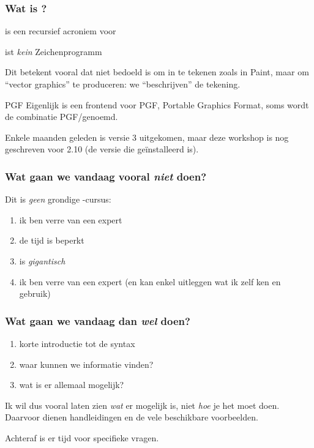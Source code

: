 \begin{frame}
  \frametitle{Wat is \TikZ?}

  \TikZ is een recursief acroniem voor
  \begin{center}
    \TikZ ist \emph{kein} Zeichenprogramm
  \end{center}
  \pause
  Dit betekent vooral dat \TikZ niet bedoeld is om in te tekenen zoals in Paint, maar om ``vector graphics'' te produceren: we ``beschrijven'' de tekening.
  \pause
  \begin{block}{PGF}
    Eigenlijk is \TikZ een frontend voor PGF, Portable Graphics Format, soms wordt de combinatie PGF/\TikZ genoemd.
  \end{block}
  \pause
  Enkele maanden geleden is versie 3 uitgekomen, maar deze workshop is nog geschreven voor 2.10 (de versie die ge\"installeerd is).
\end{frame}

\begin{frame}
  \frametitle{Wat gaan we vandaag vooral \emph{niet} doen?}

  Dit is \emph{geen} grondige \TikZ-cursus:
  \begin{enumerate}
    \item ik ben verre van een expert
    \item de tijd is beperkt
    \item \TikZ is \emph{gigantisch}
    \item\pause ik ben verre van een expert (en kan enkel uitleggen wat ik zelf ken en gebruik)
  \end{enumerate}
\end{frame}

\begin{frame}
  \frametitle{Wat gaan we vandaag dan \emph{wel} doen?}

  \begin{enumerate}
    \item korte introductie tot de syntax
    \item waar kunnen we informatie vinden?
    \item wat is er allemaal mogelijk?
  \end{enumerate}
  \pause
  Ik wil dus vooral laten zien \emph{wat} er mogelijk is, niet \emph{hoe} je het moet doen. Daarvoor dienen handleidingen en de vele beschikbare voorbeelden.
  
  \pause

  Achteraf is er tijd voor specifieke vragen.
\end{frame}

